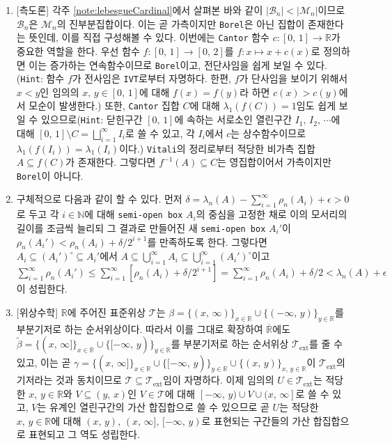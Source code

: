 \begin{enumerate}[label = \textsf{\textbf{\arabic*}}]
    \item \textsf{[측도론]} 각주 \ref{note:lebesgueCardinal}에서 살펴본 바와 같이 $|\mathcal{B}_n|<|\mathcal{M}_n|$이므로 $\mathcal{B}_n$은 $\mathcal{M}_n$의 진부분집합이다. 이는 곧 가측이지만 \texttt{Borel}은 아닌 집합이 존재한다는 뜻인데, 이를 직접 구성해볼 수 있다. 이번에는 \texttt{Cantor} 함수 $c:[0,\,1]\to\mathbb{R}$가 중요한 역할을 한다. 우선 함수 $f:[0,\,1]\to[0,\,2]$를 $f:x\mapsto x+c(x)$로 정의하면 이는 증가하는 연속함수이므로 \texttt{Borel}이고, 전단사임을 쉽게 보일 수 있다. (\texttt{Hint}: 함수 $f$가 전사임은 \texttt{IVT}로부터 자명하다. 한편, $f$가 단사임을 보이기 위해서 $x<y$인 임의의 $x,\,y\in[0,\,1]$에 대해 $f(x)=f(y)$라 하면 $c(x)>c(y)$에서 모순이 발생한다.) 또한, \texttt{Cantor} 집합 $C$에 대해 $\lambda_1(f(C))=1$임도 쉽게 보일 수 있으므로(\texttt{Hint}: 닫힌구간 $[0,\,1]$에 속하는 서로소인 열린구간 $I_1,\,I_2,\,\cdots$에 대해 $[0,\,1]\setminus C=\bigsqcup_{i=1}^\infty I_i$로 쓸 수 있고, 각 $I_i$에서 $c$는 상수함수이므로 $\lambda_1(f(I_i))=\lambda_1(I_i)$이다.) \texttt{Vitali}의 정리로부터 적당한 비가측 집합 $A\subseteq f(C)$가 존재한다. 그렇다면 $f^{-1}(A)\subseteq C$는 영집합이어서 가측이지만 \texttt{Borel}이 아니다.
    \item 구체적으로 다음과 같이 할 수 있다. 먼저 $\delta=\lambda_n(A)-\sum_{i=1}^\infty\rho_n(A_i)+\epsilon>0$로 두고 각 $i\in\mathbb{N}$에 대해 \texttt{semi-open box} $A_i$의 중심을 고정한 채로 이의 모서리의 길이를 조금씩 늘리되 그 결과로 만들어진 새 \texttt{semi-open box} $A_i'$이 $\rho_n(A_i')<\rho_n(A_i)+\delta/2^{i+1}$를 만족하도록 한다. 그렇다면 $A_i\subseteq(A_i')^\circ\subseteq A_i'$에서 $A\subseteq\bigcup_{i=1}^\infty A_i\subseteq\bigcup_{i=1}^\infty(A_i')^\circ$이고 $\sum_{i=1}^\infty\rho_n(A_i')\leq\sum_{i=1}^\infty[\rho_n(A_i)+\delta/2^{i+1}]=\sum_{i=1}^\infty\rho_n(A_i)+\delta/2<\lambda_n(A)+\epsilon$이 성립한다.
    \item \textsf{[위상수학]} $\mathbb{R}$에 주어진 표준위상 $\mathcal{T}$는 $\beta=\{(x,\,\infty)\}_{x\in\mathbb{R}}\cup\{(-\infty,\,y)\}_{y\in\mathbb{R}}$를 부분기저로 하는 순서위상이다. 따라서 이를 그대로 확장하여 $\overline{\mathbb{R}}$에도 $\widetilde{\beta}=\{(x,\,\infty]\}_{x\in\mathbb{R}}\cup\{[-\infty,\,y)\}_{y\in\mathbb{R}}$를 부분기저로 하는 순서위상 $\mathcal{T}_\mathrm{ext}$를 줄 수 있고, 이는 곧 $\gamma=\{(x,\,\infty]\}_{x\in\mathbb{R}}\cup\{[-\infty,\,y)\}_{y\in\mathbb{R}}\cup\{(x,\,y)\}_{x,\,y\in\mathbb{R}}$이 $\mathcal{T}_\mathrm{ext}$의 기저라는 것과 동치이므로 $\mathcal{T}\subseteq\mathcal{T}_\mathrm{ext}$임이 자명하다. 이제 임의의 $U\in\mathcal{T}_\mathrm{ext}$는 적당한 $x,\,y\in\mathbb{R}$와 $V\subseteq(y,\,x)$인 $V\in\mathcal{T}$에 대해 $[-\infty,\,y)\cup V\cup(x,\,\infty]$로 쓸 수 있고, $V$는 유계인 열린구간의 가산 합집합으로 쓸 수 있으므로 곧 $U$는 적당한 $x,\,y\in\mathbb{R}$에 대해 $(x,\,y),\,(x,\,\infty],\,[-\infty,\,y)$로 표현되는 구간들의 가산 합집합으로 표현되고 그 역도 성립한다.


\end{enumerate}
